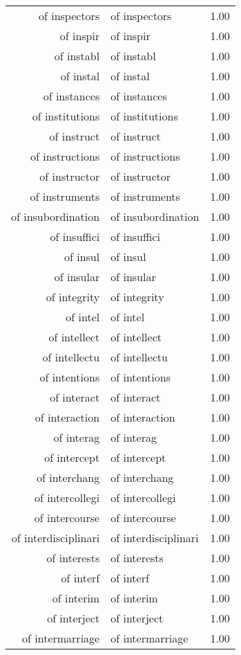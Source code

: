 \begin{table}[ht]
\begin{tabular}{rlr}
  of inspectors & of inspectors & 1.00 \\ 
  of inspir & of inspir & 1.00 \\ 
  of instabl & of instabl & 1.00 \\ 
  of instal & of instal & 1.00 \\ 
  of instances & of instances & 1.00 \\ 
  of institutions & of institutions & 1.00 \\ 
  of instruct & of instruct & 1.00 \\ 
  of instructions & of instructions & 1.00 \\ 
  of instructor & of instructor & 1.00 \\ 
  of instruments & of instruments & 1.00 \\ 
  of insubordination & of insubordination & 1.00 \\ 
  of insuffici & of insuffici & 1.00 \\ 
  of insul & of insul & 1.00 \\ 
  of insular & of insular & 1.00 \\ 
  of integrity & of integrity & 1.00 \\ 
  of intel & of intel & 1.00 \\ 
  of intellect & of intellect & 1.00 \\ 
  of intellectu & of intellectu & 1.00 \\ 
  of intentions & of intentions & 1.00 \\ 
  of interact & of interact & 1.00 \\ 
  of interaction & of interaction & 1.00 \\ 
  of interag & of interag & 1.00 \\ 
  of intercept & of intercept & 1.00 \\ 
  of interchang & of interchang & 1.00 \\ 
  of intercollegi & of intercollegi & 1.00 \\ 
  of intercourse & of intercourse & 1.00 \\ 
  of interdisciplinari & of interdisciplinari & 1.00 \\ 
  of interests & of interests & 1.00 \\ 
  of interf & of interf & 1.00 \\ 
  of interim & of interim & 1.00 \\ 
  of interject & of interject & 1.00 \\ 
  of intermarriage & of intermarriage & 1.00 \\ 

\end{tabular}
\end{table}
